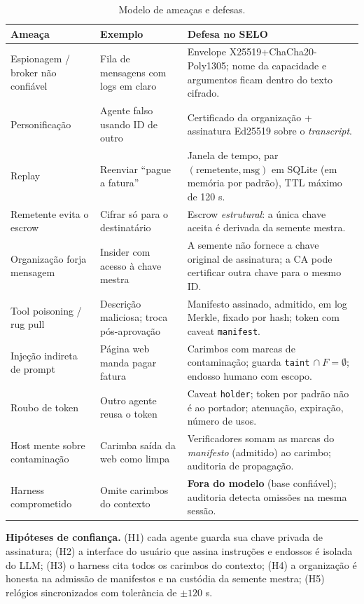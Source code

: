 \documentclass[11pt,a4paper]{article}
\theoremstyle{plain}
\theoremstyle{definition}
\theoremstyle{remark}
\newcommand{\cod}[1]{\texttt{#1}}
\begin{document}
\begin{table}[h!]
\centering\small
\begin{tabular}{p{3.3cm}p{4.4cm}p{6.3cm}}
\toprule
\rowcolor{corCaixa}\textbf{Ameaça} & \textbf{Exemplo} & \textbf{Defesa no SELO} \\
\midrule
Espionagem / broker não confiável & Fila de mensagens com logs em claro & Envelope X25519+ChaCha20-Poly1305; nome da capacidade e argumentos ficam dentro do texto cifrado. \\
Personificação & Agente falso usando ID de outro & Certificado da organização + assinatura Ed25519 sobre o \emph{transcript}. \\
Replay & Reenviar ``pague a fatura'' & Janela de tempo, par $(\text{remetente},\text{msg})$ em SQLite (em memória por padrão), TTL máximo de 120 s. \\
Remetente evita o escrow & Cifrar só para o destinatário & Escrow \emph{estrutural}: a única chave aceita é derivada da semente mestra. \\
Organização forja mensagem & Insider com acesso à chave mestra & A semente não fornece a chave original de assinatura; a CA pode certificar outra chave para o mesmo ID. \\
Tool poisoning / rug pull & Descrição maliciosa; troca pós-aprovação & Manifesto assinado, admitido, em log Merkle, fixado por hash; token com caveat \cod{manifest}. \\
Injeção indireta de prompt & Página web manda pagar fatura & Carimbos com marcas de contaminação; guarda \cod{taint}$\,\cap F=\emptyset$; endosso humano com escopo. \\
Roubo de token & Outro agente reusa o token & Caveat \cod{holder}; token por padrão não é ao portador; atenuação, expiração, número de usos. \\
Host mente sobre contaminação & Carimba saída da web como limpa & Verificadores somam as marcas do \emph{manifesto} (admitido) ao carimbo; auditoria de propagação. \\
Harness comprometido & Omite carimbos do contexto & \textbf{Fora do modelo} (base confiável); auditoria detecta omissões na mesma sessão. \\
\bottomrule
\end{tabular}
\caption{Modelo de ameaças e defesas.}
\end{table}

\textbf{Hipóteses de confiança.}
(H1) cada agente guarda sua chave privada de assinatura; (H2) a interface do usuário que assina instruções e endossos é isolada do LLM; (H3) o harness cita todos os carimbos do contexto; (H4) a organização é honesta na admissão de manifestos e na custódia da semente mestra; (H5) relógios sincronizados com tolerância de $\pm 120$ s.
\end{document}
